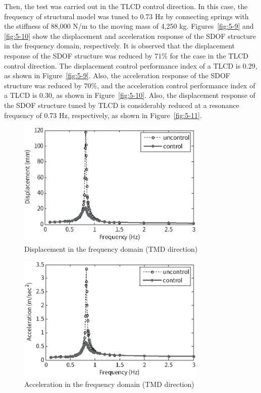 Then, the test was carried out in the TLCD control direction. In this case, the frequency of structural model was tuned to 0.73 Hz by connecting springs with the stiffness of 88,000 N/m to the moving mass of 4,250 kg. Figures~\ref{fig:5-9} and \ref{fig:5-10} show the displacement and acceleration response of the SDOF structure in the frequency domain, respectively. It is observed that the displacement response of the SDOF structure was reduced by $71\%$ for the case in the TLCD control direction. The displacement control performance index of a TLCD is 0.29, as shown in Figure~\ref{fig:5-9}. Also, the acceleration response of the SDOF structure was reduced by $70\%$, and the acceleration control performance index of a TLCD is 0.30, as shown in Figure~\ref{fig:5-10}. Also, the displacement response of the SDOF structure tuned by TLCD is considerably reduced at a resonance frequency of 0.73 Hz, respectively, as shown in Figure~\ref{fig:5-11}.

\begin{figure}[ht]
\centering
\includegraphics[width=0.8\textwidth] {figure/5-6.eps}
\caption{Displacement in the frequency domain (TMD direction)}
\label{fig:5-6}
\end{figure}

\begin{figure}[ht]
\centering
\includegraphics[width=0.8\textwidth] {figure/5-7.eps}
\caption{Acceleration in the frequency domain (TMD direction)}
\label{fig:5-7}
\end{figure}

